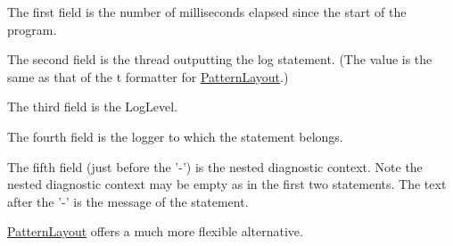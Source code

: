The first field is the number of milliseconds elapsed since the start of the program.

The second field is the thread outputting the log statement. (The value is the same as that of the {\ttfamily t} formatter for \hyperlink{classlog4cplus_1_1PatternLayout}{Pattern\-Layout}.)

The third field is the Log\-Level.

The fourth field is the logger to which the statement belongs.

The fifth field (just before the '-\/') is the nested diagnostic context. Note the nested diagnostic context may be empty as in the first two statements. The text after the '-\/' is the message of the statement.

\hyperlink{classlog4cplus_1_1PatternLayout}{Pattern\-Layout} offers a much more flexible alternative. 


